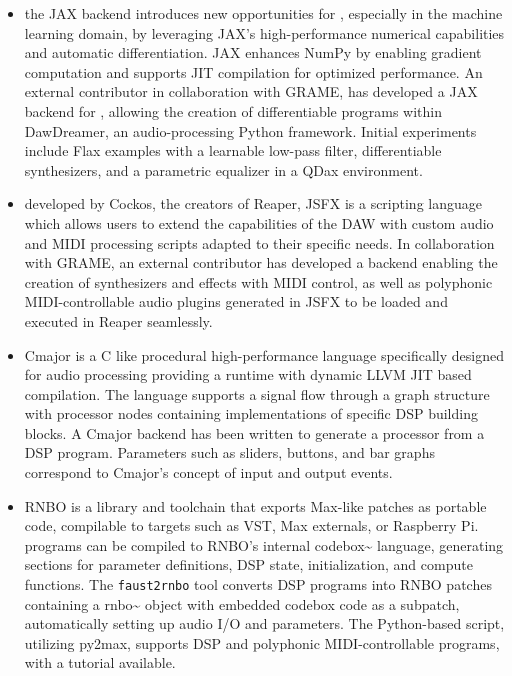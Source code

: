 \begin{itemize}
\item
  the JAX backend introduces new opportunities for \F{}, especially in
  the machine learning domain, by leveraging JAX's high-performance
  numerical capabilities and automatic differentiation. JAX enhances
  NumPy by enabling gradient computation and supports JIT compilation
  for optimized performance. An external contributor in collaboration
  with GRAME, has developed a JAX backend for \F{}, allowing the
  creation of differentiable \F{} programs within DawDreamer, an
  audio-processing Python framework. Initial experiments include Flax
  examples with a learnable low-pass filter, differentiable
  synthesizers, and a parametric equalizer in a QDax environment.
\item
  developed by Cockos, the creators of Reaper, JSFX is a scripting
  language which allows users to extend the capabilities of the DAW with
  custom audio and MIDI processing scripts adapted to their specific
  needs. In collaboration with GRAME, an external contributor has
  developed a backend enabling the creation of synthesizers and effects
  with MIDI control, as well as polyphonic MIDI-controllable audio
  plugins generated in JSFX to be loaded and executed in Reaper
  seamlessly.
\item
  Cmajor is a C like procedural high-performance language specifically
  designed for audio processing providing a runtime with dynamic LLVM
  JIT based compilation. The language supports a signal flow through a
  graph structure with processor nodes containing implementations of
  specific DSP building blocks. A Cmajor backend has been written to
  generate a processor from a \F{} DSP program. Parameters such as
  sliders, buttons, and bar graphs correspond to Cmajor's concept of
  input and output events.
\item
  RNBO is a library and toolchain that exports Max-like patches as
  portable code, compilable to targets such as VST, Max externals, or
  Raspberry Pi. \F{} programs can be compiled to RNBO's internal
  codebox\textasciitilde{} language, generating sections for parameter
  definitions, DSP state, initialization, and compute functions. The
  \texttt{faust2rnbo} tool converts \F{} DSP programs into RNBO patches
  containing a rnbo\textasciitilde{} object with embedded codebox code
  as a subpatch, automatically setting up audio I/O and parameters. The
  Python-based script, utilizing py2max, supports DSP and polyphonic
  MIDI-controllable programs, with a tutorial available.
\end{itemize}


